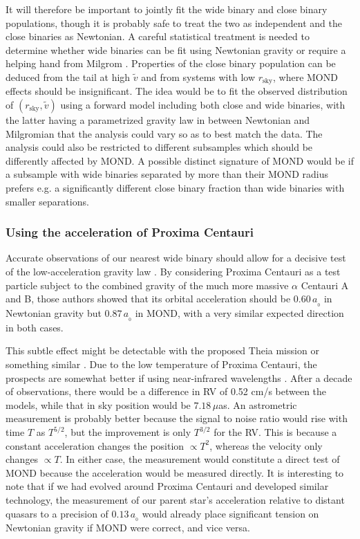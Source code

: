 \documentclass[fleqn,usenatbib,useAMS,onecolumn]{mnras} %
\begin{document}
It will therefore be important to jointly fit the wide binary and close binary populations, though it is probably safe to treat the two as independent and the close binaries as Newtonian. A careful statistical treatment is needed to determine whether wide binaries can be fit using Newtonian gravity or require a helping hand from Milgrom \citep*[for a detailed plan, see][]{Banik_2021_plan}. Properties of the close binary population can be deduced from the tail at high $\widetilde{v}$ and from systems with low $r_{\text{sky}}$, where MOND effects should be insignificant. The idea would be to fit the observed distribution of $\left( r_{\text{sky}}, \widetilde{v} \right)$ using a forward model including both close and wide binaries, with the latter having a parametrized gravity law in between Newtonian and Milgromian that the analysis could vary so as to best match the data. The analysis could also be restricted to different subsamples which should be differently affected by MOND. A possible distinct signature of MOND would be if a subsample with wide binaries separated by more than their MOND radius prefers e.g. a significantly different close binary fraction than wide binaries with smaller separations.


\subsubsection{Using the acceleration of Proxima Centauri}
\label{Wide_binaries_using_Proxima}

Accurate observations of our nearest wide binary should allow for a decisive test of the low-acceleration gravity law \citep{Banik_2019_Proxima}. By considering Proxima Centauri as a test particle subject to the combined gravity of the much more massive $\alpha$ Centauri A and B, those authors showed that its orbital acceleration should be $0.60 \, a_{_0}$ in Newtonian gravity but $0.87 \, a_{_0}$ in MOND, with a very similar expected direction in both cases.

This subtle effect might be detectable with the proposed Theia mission \citep{Theia_2017} or something similar \citep{Hobbs_2021}. Due to the low temperature of Proxima Centauri, the prospects are somewhat better if using near-infrared wavelengths \citep{Malbet_2021}. After a decade of observations, there would be a difference in RV of 0.52 cm/s between the models, while that in sky position would be $7.18 \, \mu$as. An astrometric measurement is probably better because the signal to noise ratio would rise with time $T$ as $T^{5/2}$, but the improvement is only $T^{3/2}$ for the RV. This is because a constant acceleration changes the position $\propto T^2$, whereas the velocity only changes $\propto T$. In either case, the measurement would constitute a direct test of MOND because the acceleration would be measured directly. It is interesting to note that if we had evolved around Proxima Centauri and developed similar technology, the measurement of our parent star's acceleration relative to distant quasars to a precision of $0.13 \, a_{_0}$ \citep{Klioner_2021} would already place significant tension on Newtonian gravity if MOND were correct, and vice versa.
\end{document}
